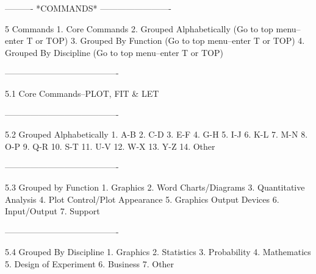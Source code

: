  
 
 
 
 
 
 
 
 
 
 
 
 
 
 
 
 
 
 
 
 
 
 
 
 
 
 
 
 
 
 
 
 
 
 
----------  *COMMANDS*  -------------------------
 
5
Commands
   1. Core Commands
   2. Grouped Alphabetically (Go to top menu--enter T or TOP)
   3. Grouped By Function (Go to top menu--enter T or TOP)
   4. Grouped By Discipline (Go to top menu--enter T or TOP)
 
----------------------------------------
 
5.1
Core Commands--PLOT, FIT & LET
 
----------------------------------------
 
5.2
Grouped Alphabetically
   1. A-B
   2. C-D
   3. E-F
   4. G-H
   5. I-J
   6. K-L
   7. M-N
   8. O-P
   9. Q-R
  10. S-T
  11. U-V
  12. W-X
  13. Y-Z
  14. Other
 
----------------------------------------
 
5.3
Grouped by Function
   1. Graphics
   2. Word Charts/Diagrams
   3. Quantitative Analysis
   4. Plot Control/Plot Appearance
   5. Graphics Output Devices
   6. Input/Output
   7. Support
 
----------------------------------------
 
5.4
Grouped By Discipline
   1. Graphics
   2. Statistics
   3. Probability
   4. Mathematics
   5. Design of Experiment
   6. Business
   7. Other
 
 
 
 
 
 
 
 
 
 
 
 
 
 
 
 
 
 
 
 
 
 
 
